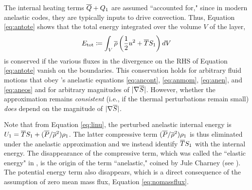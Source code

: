 \documentclass[12pt]{article}
\begin{document}
 The internal heating terms $\overline{Q} + Q_1$ are assumed ``accounted for," since in modern anelastic codes, they are typically inputs to drive convection. Thus, Equation \eqref{eq:antote} shows that the total energy integrated over the volume $V$ of the layer,
\begin{align}
	E_{\rm tot} \coloneqq \int_V \overline{\rho}\left(\frac{1}{2} u^2 + \overline{T} S_1\right) dV
\end{align}
is conserved if the various fluxes in the divergence on the RHS of Equation \eqref{eq:antote} vanish on the boundaries. This conservation holds for arbitrary fluid motions that obey \citet{Gough1969}'s anelastic equations \eqref{eq:ancont}, \eqref{eq:anmom}, \eqref{eq:anen}, and \eqref{eq:aneos} and for arbitrary magnitudes of $|\nabla \overline{S}|$. However, whether the approximation remains \textit{consistent} (i.e., if the thermal perturbations remain small) \textit{does} depend on the magnitude of $|\nabla\overline{S}|$.

Note that from Equation \eqref{eq:linu}, the perturbed anelastic internal energy is $U_1 = \overline{T} S_1 + (\overline{P}/\overline{\rho}^2)\rho_1$. The latter compressive term $(\overline{P}/\overline{\rho}^2)\rho_1$ is thus eliminated under the anelastic approximation and we instead identify $\overline{T} S_1$ with the internal energy. The disappearance of the compressive term, which was called the ``elastic energy" in \citet{Eckart1956}, is the origin of the term ``anelastic," coined by Jule Charney (see \citealt{Ogura1962}). The potential energy term also disappears, which is a direct consequence of the assumption of zero mean mass flux, Equation \eqref{eq:nomassflux}. 
\end{document}
